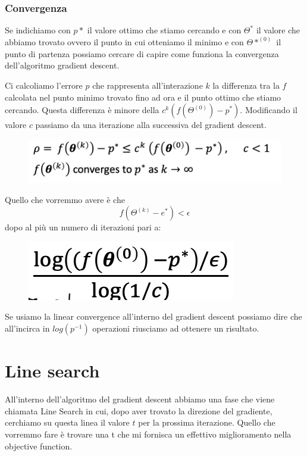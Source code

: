 \documentclass[14pt]{extreport}
\begin{document}
\subsubsection{Convergenza}

Se indichiamo con $p*$ il valore ottimo che stiamo cercando e con $\Theta^{*}$ il valore che abbiamo trovato ovvero il punto in cui otteniamo il
minimo e con $\Theta*^{(0)}$ il punto di partenza possiamo cercare di capire come funziona la convergenza dell'algoritmo gradient descent.

Ci calcoliamo l'errore $p$ che rappresenta all'interazione $k$ la differenza tra la $f$ calcolata nel punto minimo trovato fino ad ora e il punto
ottimo che stiamo cercando. Questa differenza è minore della $c^k(f(\Theta ^{(0)})-p^*)$. Modificando il valore $c$ passiamo da una iterazione alla
successiva del gradient descent.

\begin{figure}[H]
	\centering
	\includegraphics[width=0.7\linewidth]{239.jpeg}
\end{figure}

Quello che vorremmo avere è che $$f( \Theta^{(k)} - e^{*} ) < \epsilon $$ dopo al più un numero di iterazioni pari a:

\begin{figure}[H]
	\centering
	\includegraphics[width=0.4\linewidth]{240.jpeg}
\end{figure}

Se usiamo la linear convergence all'interno del gradient descent possiamo dire che all'incirca in $log(p^{-1})$ operazioni riusciamo ad ottenere un
risultato.

\section{Line search}

All'interno dell'algoritmo del gradient descent abbiamo una fase che viene chiamata Line Search in cui, dopo aver trovato la direzione del gradiente,
cerchiamo su questa linea il valore $t$ per la prossima iterazione. Quello che vorremmo fare è trovare una t che mi fornisca un effettivo
miglioramento nella objective function.
\end{document}
